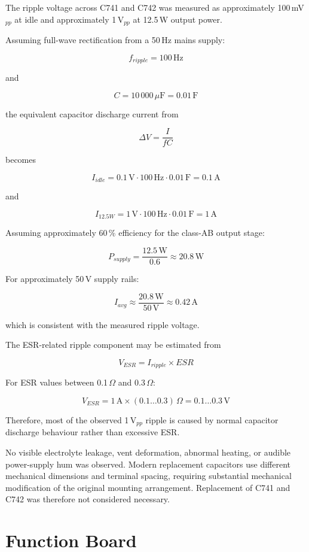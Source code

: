 \documentclass[]{article}
\begin{document}
The ripple voltage across C741 and C742 was measured as approximately 100\,mV$_{pp}$ at idle and approximately 1\,V$_{pp}$ at 12.5\,W output power.

Assuming full-wave rectification from a 50\,Hz mains supply:

\[
f_{ripple} = 100\,\mathrm{Hz}
\]

and

\[
C = 10\,000\,\mu\mathrm{F} = 0.01\,\mathrm{F}
\]

the equivalent capacitor discharge current from

\[
\Delta V = \frac{I}{fC}
\]

becomes

\[
I_{idle}
=
0.1\,\mathrm{V}
\cdot
100\,\mathrm{Hz}
\cdot
0.01\,\mathrm{F}
=
0.1\,\mathrm{A}
\]

and

\[
I_{12.5W}
=
1\,\mathrm{V}
\cdot
100\,\mathrm{Hz}
\cdot
0.01\,\mathrm{F}
=
1\,\mathrm{A}
\]

Assuming approximately 60\,\% efficiency for the class-AB output stage:

\[
P_{supply}
=
\frac{12.5\,\mathrm{W}}{0.6}
\approx
20.8\,\mathrm{W}
\]

For approximately 50\,V supply rails:

\[
I_{avg}
\approx
\frac{20.8\,\mathrm{W}}{50\,\mathrm{V}}
\approx
0.42\,\mathrm{A}
\]

which is consistent with the measured ripple voltage.

The ESR-related ripple component may be estimated from

\[
V_{ESR} = I_{ripple} \times ESR
\]

For ESR values between 0.1\,\(\Omega\) and 0.3\,\(\Omega\):

\[
V_{ESR}
=
1\,\mathrm{A}
\times
(0.1 \ldots 0.3)\,\Omega
=
0.1 \ldots 0.3\,\mathrm{V}
\]

Therefore, most of the observed 1\,V$_{pp}$ ripple is caused by normal capacitor discharge behaviour rather than excessive ESR.

No visible electrolyte leakage, vent deformation, abnormal heating, or audible power-supply hum was observed. Modern replacement capacitors use different mechanical dimensions and terminal spacing, requiring substantial mechanical modification of the original mounting arrangement. Replacement of C741 and C742 was therefore not considered necessary.

\section{Function Board}
\end{document}
